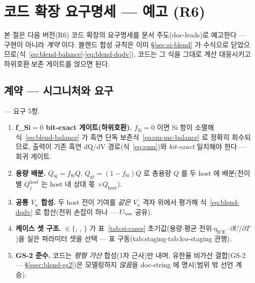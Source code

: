 \section{코드 확장 요구명세 ---  예고 (R6)}\label{sec:si-code}
본 절은 다음 버전(R6) 코드 확장의 요구명세를 문서 주도(doc-leads)로 예고한다 --- 구현이 아니라 \emph{계약}
이다. 블렌드 합성 규칙은 이미 \S\ref{sec:si-blend} 가 수식으로 닫았으므로(식~\eqref{eq:blend-balance}$\cdot$\eqref{eq:blend-dqdv}),
코드는 그 식을 그대로 계산 대응시키고 하위호환$\cdot$보존 게이트를 얹으면 된다.

\subsection{계약 --- 시그니처와 요구}\label{ssec:si-code-spec}
\begin{codebox}
\textbf{} --- 요구 5항.
\begin{enumerate}[label=(\arabic*),leftmargin=2.0em,itemsep=1pt]
\item \textbf{f\_Si$=0$ bit-exact 게이트(하위호환).} $f_\mathrm{Si}{=}0$ 이면 Si 항이 소멸해
식~\eqref{eq:blend-balance} 가 흑연 단독 보존식~\eqref{eq:sm-mc-balance} 로 정확히 회수되므로, 출력이
기존 흑연 dQ/dV 경로(식~\eqref{eq:sum})와 \emph{bit-exact} 일치해야 한다 --- 회귀 게이트.
\item \textbf{용량 배분.} $Q_\mathrm{Si}=f_\mathrm{Si}Q$, $Q_\mathrm{gr}=(1-f_\mathrm{Si})Q$ 로 총용량 $Q$ 를
두 host 에 배분(전이별 $Q_j^{\mathrm{host}}$ 는 host 내 상대 몫 $\times Q_\mathrm{host}$).
\item \textbf{공통 $V_n$ 합성.} 두 host 전이 기여를 \emph{같은} $V_n$ 격자 위에서 평가해
식~\eqref{eq:blend-dqdv} 로 합산(전위 손잡이 하나 --- $U_\oc$ 공유).
\item \textbf{케이스 셋 구조.} $\in\{$, , $\}$ 가
표~\ref{tab:si-cases} 초기값(용량$\cdot$평균 전위$\cdot\eta_\mathrm{ICE}\cdot\partial U/\partial T$)을 실은
파라미터 셋을 선택 --- 표 구동(tab:staging$\cdot$tab:lco-staging 관행).
\item \textbf{GS-2 준수.} 코드는 \emph{평형 가산} 합성(1차 근사)만 내며, 유한율 비가산 결합(GS-2 ---
\S\ref{ssec:blend-gs2})은 모델링하지 \emph{않음}을 doc-string 에 명시(범위 밖 선언 계승).
\end{enumerate}
\end{codebox}

